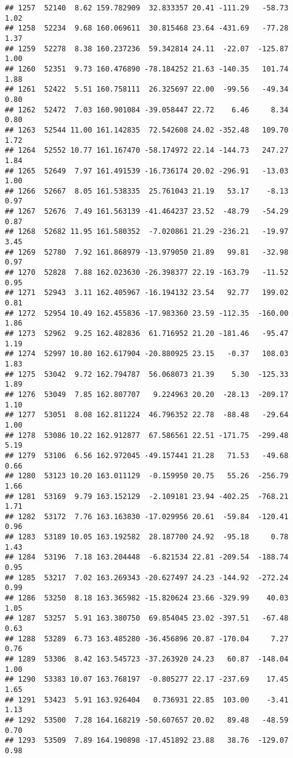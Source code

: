 \documentclass[]{article}
\begin{document}
\begin{verbatim}
## 1257  52140  8.62 159.782909  32.833357 20.41 -111.29   -58.73  1.02
## 1258  52234  9.68 160.069611  30.815468 23.64 -431.69   -77.28  1.37
## 1259  52278  8.38 160.237236  59.342814 24.11  -22.07  -125.87  1.00
## 1260  52351  9.73 160.476890 -78.184252 21.63 -140.35   101.74  1.88
## 1261  52422  5.51 160.758111  26.325697 22.00  -99.56   -49.34  0.80
## 1262  52472  7.03 160.901084 -39.058447 22.72    6.46     8.34  0.80
## 1263  52544 11.00 161.142835  72.542608 24.02 -352.48   109.70  1.72
## 1264  52552 10.77 161.167470 -58.174972 22.14 -144.73   247.27  1.84
## 1265  52649  7.97 161.491539 -16.736174 20.02 -296.91   -13.03  1.00
## 1266  52667  8.05 161.538335  25.761043 21.19   53.17    -8.13  0.97
## 1267  52676  7.49 161.563139 -41.464237 23.52  -48.79   -54.29  0.87
## 1268  52682 11.95 161.580352  -7.020861 21.29 -236.21   -19.97  3.45
## 1269  52780  7.92 161.868979 -13.979050 21.89   99.81   -32.98  0.97
## 1270  52828  7.88 162.023630 -26.398377 22.19 -163.79   -11.52  0.95
## 1271  52943  3.11 162.405967 -16.194132 23.54   92.77   199.02  0.81
## 1272  52954 10.49 162.455836 -17.983360 23.59 -112.35  -160.00  1.86
## 1273  52962  9.25 162.482836  61.716952 21.20 -181.46   -95.47  1.19
## 1274  52997 10.80 162.617904 -20.880925 23.15   -0.37   108.03  1.83
## 1275  53042  9.72 162.794787  56.068073 21.39    5.30  -125.33  1.89
## 1276  53049  7.85 162.807707   9.224963 20.20  -28.13  -209.17  1.10
## 1277  53051  8.08 162.811224  46.796352 22.78  -88.48   -29.64  1.00
## 1278  53086 10.22 162.912877  67.586561 22.51 -171.75  -299.48  5.19
## 1279  53106  6.56 162.972045 -49.157441 21.28   71.53   -49.68  0.66
## 1280  53123 10.20 163.011129  -0.159950 20.75   55.26  -256.79  1.66
## 1281  53169  9.79 163.152129  -2.109181 23.94 -402.25  -768.21  1.71
## 1282  53172  7.76 163.163830 -17.029956 20.61  -59.84  -120.41  0.96
## 1283  53189 10.05 163.192582  28.187700 24.92  -95.18     0.78  1.43
## 1284  53196  7.18 163.204448  -6.821534 22.81 -209.54  -188.74  0.95
## 1285  53217  7.02 163.269343 -20.627497 24.23 -144.92  -272.24  0.99
## 1286  53250  8.18 163.365982 -15.820624 23.66 -329.99    40.03  1.05
## 1287  53257  5.91 163.380750  69.854045 23.02 -397.51   -67.48  0.63
## 1288  53289  6.73 163.485280 -36.456896 20.87 -170.04     7.27  0.76
## 1289  53306  8.42 163.545723 -37.263920 24.23   60.87  -148.04  1.00
## 1290  53383 10.07 163.768197  -0.805277 22.17 -237.69    17.45  1.65
## 1291  53423  5.91 163.926404   0.736931 22.85  103.00    -3.41  1.13
## 1292  53500  7.28 164.168219 -50.607657 20.02   89.48   -48.59  0.70
## 1293  53509  7.89 164.190898 -17.451892 23.88   38.76  -129.07  0.98

\end{verbatim}
\end{document}
